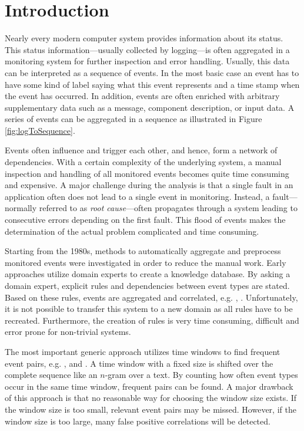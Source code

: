 \documentclass[conference]{IEEEtran}
\theoremstyle{examplestyle}
\begin{document}
\section{Introduction}
Nearly every modern computer system provides information about its status. This status information---usually collected by logging---is often aggregated in a monitoring system for further inspection and error handling. Usually, this data can be interpreted as a sequence of events. In the most basic case an event has to have some kind of label saying what this event represents and a time stamp when the event has occurred. In addition, events are often enriched with arbitrary supplementary data such as a message, component description, or input data. A series of events can be aggregated in a sequence as illustrated in Figure \ref{fig:logToSequence}.

Events often influence and trigger each other, and hence, form a network of dependencies. With a certain complexity of the underlying system, a manual inspection and handling of all monitored events becomes quite time consuming and expensive. A major challenge during the analysis is that a single fault in an application often does not lead to a single event in monitoring. Instead, a fault---normally referred to as \textit{root cause}---often propagates through a system leading to consecutive errors depending on the first fault. This flood of events makes the determination of the actual problem complicated and time consuming.

Starting from the 1980s, methods to automatically aggregate and preprocess monitored events were investigated in order to reduce the manual work. Early approaches utilize domain experts to create a knowledge database. By asking a domain expert, explicit rules and dependencies between event types are stated. Based on these rules, events are aggregated and correlated, e.g. \cite{Houck1995}, \cite{Kettschau2002}. Unfortunately, it is not possible to transfer this system to a new domain as all rules have to be recreated. Furthermore, the creation of rules is very time consuming, difficult and error prone for non-trivial systems.

The most important generic approach utilizes time windows to find frequent event pairs, e.g. \cite{Jakobson1993}, \cite{Mannila1997} and \cite{Bouandas2007}. A time window with a fixed size is shifted over the complete sequence like an \(n\)-gram over a text. By counting how often event types occur in the same time window, frequent pairs can be found. A major drawback of this approach is that no reasonable way for choosing the window size exists. If the window size is too small, relevant event pairs may be missed. However, if the window size is too large, many false positive correlations will be detected.
\end{document}
